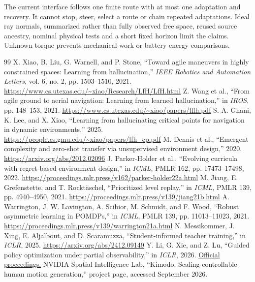 \documentclass[10pt]{article}
\begin{document}
The current interface follows one finite route with at most one adaptation and
recovery. It cannot stop, steer, select a route or chain repeated adaptations.
Ideal ray normals, summarized rather than fully observed free space, reused
source ancestry, nominal physical tests and a short fixed horizon limit the
claims. Unknown torque prevents mechanical-work or battery-energy comparisons.

\clearpage
\appendix

\begin{thebibliography}{99}
 X. Xiao, B. Liu, G. Warnell, and P. Stone,
``Toward agile maneuvers in highly constrained spaces: Learning from hallucination,''
\emph{IEEE Robotics and Automation Letters}, vol. 6, no. 2, pp. 1503--1510, 2021.
\url{https://www.cs.utexas.edu/~xiao/Research/LfH/LfH.html}
 Z. Wang et al., ``From agile ground to aerial navigation:
Learning from learned hallucination,'' in \emph{IROS}, pp. 148--153, 2021.
\url{https://www.cs.utexas.edu/~xiao/papers/lflh.pdf}
 S. A. Ghani, K. Lee, and X. Xiao, ``Learning from hallucinating
critical points for navigation in dynamic environments,'' 2025.
\url{https://people.cs.gmu.edu/~xiao/papers/lfh_cp.pdf}
 M. Dennis et al., ``Emergent complexity and zero-shot transfer
via unsupervised environment design,'' 2020.
\url{https://arxiv.org/abs/2012.02096}
 J. Parker-Holder et al., ``Evolving curricula with regret-based
environment design,'' in \emph{ICML}, PMLR 162, pp. 17473--17498, 2022.
\url{https://proceedings.mlr.press/v162/parker-holder22a.html}
 M. Jiang, E. Grefenstette, and T. Rockt\"aschel,
``Prioritized level replay,'' in \emph{ICML}, PMLR 139, pp. 4940--4950, 2021.
\url{https://proceedings.mlr.press/v139/jiang21b.html}
 A. Warrington, J. W. Lavington, A. Scibior, M. Schmidt, and F. Wood,
``Robust asymmetric learning in POMDPs,'' in \emph{ICML}, PMLR 139,
pp. 11013--11023, 2021.
\url{https://proceedings.mlr.press/v139/warrington21a.html}
 N. Messikommer, J. Xing, E. Aljalbout, and D. Scaramuzza,
``Student-informed teacher training,'' in \emph{ICLR}, 2025.
\url{https://arxiv.org/abs/2412.09149}
 Y. Li, G. Xie, and Z. Lu,
``Guided policy optimization under partial observability,'' in \emph{ICLR}, 2026.
\href{https://proceedings.iclr.cc/paper_files/paper/2026/hash/398753ddd2e10ce39d0c620e85fab922-Abstract-Conference.html}{Official proceedings.}
 NVIDIA Spatial Intelligence Lab, ``Kimodo: Scaling controllable
human motion generation,'' project page, accessed September 2026.

\end{thebibliography}
\end{document}
